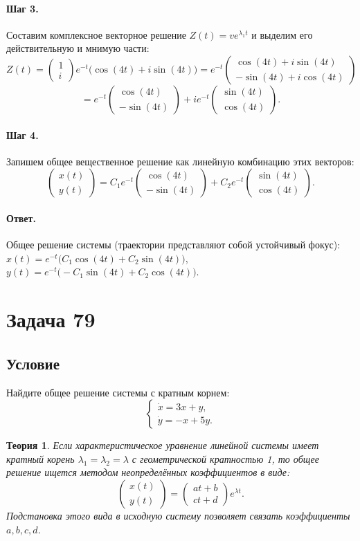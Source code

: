 \documentclass[12pt,a4paper]{article}
\theoremstyle{solution}
\newtheorem*{theory}{Теория}
\newcommand{\task}[1]{\newpage\section*{Задача #1}}
\newcommand{\answer}{\paragraph{Ответ.}}
\newcommand{\step}[1]{\paragraph{Шаг #1.}}
\begin{document}
\step{3} Составим комплексное векторное решение $Z(t) = v e^{\lambda_1 t}$ и выделим его действительную и мнимую части:
\[
Z(t) = \begin{pmatrix} 1 \\ i \end{pmatrix} e^{-t} \big( \cos(4t) + i\sin(4t) \big) = e^{-t} \begin{pmatrix} \cos(4t) + i\sin(4t) \\ -\sin(4t) + i\cos(4t) \end{pmatrix}
\]
\[
= e^{-t} \begin{pmatrix} \cos(4t) \\ -\sin(4t) \end{pmatrix} + i e^{-t} \begin{pmatrix} \sin(4t) \\ \cos(4t) \end{pmatrix}.
\]

\step{4} Запишем общее вещественное решение как линейную комбинацию этих векторов:
\[
\begin{pmatrix} x(t) \\ y(t) \end{pmatrix} = C_1 e^{-t} \begin{pmatrix} \cos(4t) \\ -\sin(4t) \end{pmatrix} + C_2 e^{-t} \begin{pmatrix} \sin(4t) \\ \cos(4t) \end{pmatrix}.
\]

\answer
Общее решение системы (траектории представляют собой устойчивый фокус): \\
$x(t) = e^{-t} \big( C_1 \cos(4t) + C_2 \sin(4t) \big)$, \\
$y(t) = e^{-t} \big( -C_1 \sin(4t) + C_2 \cos(4t) \big)$.

\task{79}
\subsection*{Условие}
Найдите общее решение системы с кратным корнем:
\[
\begin{cases}
\dot{x} = 3x + y, \\
\dot{y} = -x + 5y.
\end{cases}
\]

\begin{theory}
Если характеристическое уравнение линейной системы имеет кратный корень $\lambda_1 = \lambda_2 = \lambda$ с геометрической кратностью 1, то общее решение ищется методом неопределённых коэффициентов в виде:
\[
\begin{pmatrix} x(t) \\ y(t) \end{pmatrix} = \begin{pmatrix} a t + b \\ c t + d \end{pmatrix} e^{\lambda t}.
\]
Подстановка этого вида в исходную систему позволяет связать коэффициенты $a, b, c, d$.
\end{theory}
\end{document}
